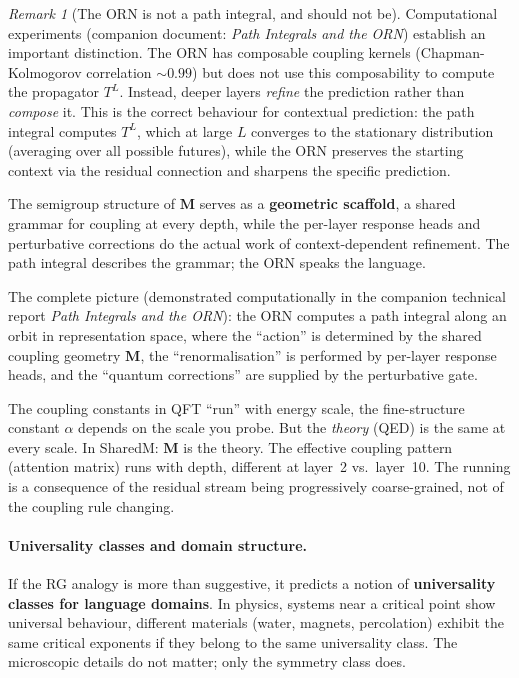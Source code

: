 \documentclass[11pt, a4paper]{article}
\newcommand{\M}{\mathbf{M}}
\theoremstyle{remark}
\newtheorem*{remark}{Remark}
\begin{document}
\begin{remark}[The ORN is not a path integral, and should not be]
Computational experiments (companion document: \textit{Path Integrals and the ORN}) establish an important distinction.
The ORN has composable coupling kernels (Chapman-Kolmogorov correlation ${\sim}0.99$) but does not use this composability to compute the propagator $T^L$.
Instead, deeper layers \emph{refine} the prediction rather than \emph{compose} it.
This is the correct behaviour for contextual prediction: the path integral computes $T^L$, which at large $L$ converges to the stationary distribution (averaging over all possible futures), while the ORN preserves the starting context via the residual connection and sharpens the specific prediction.

The semigroup structure of $\M$ serves as a \textbf{geometric scaffold}, a shared grammar for coupling at every depth, while the per-layer response heads and perturbative corrections do the actual work of context-dependent refinement.
The path integral describes the grammar; the ORN speaks the language.

The complete picture (demonstrated computationally in the companion technical report \textit{Path Integrals and the ORN}): the ORN computes a path integral along an orbit in representation space, where the ``action'' is determined by the shared coupling geometry $\M$, the ``renormalisation'' is performed by per-layer response heads, and the ``quantum corrections'' are supplied by the perturbative gate.
\end{remark}

The coupling constants in QFT ``run'' with energy scale, the fine-structure constant $\alpha$ depends on the scale you probe.
But the \emph{theory} (QED) is the same at every scale.
In SharedM: $\M$ is the theory.
The effective coupling pattern (attention matrix) runs with depth, different at layer~2 vs.\ layer~10.
The running is a consequence of the residual stream being progressively coarse-grained, not of the coupling rule changing.

\paragraph{Universality classes and domain structure.}
If the RG analogy is more than suggestive, it predicts a notion of \textbf{universality classes for language domains}.
In physics, systems near a critical point show universal behaviour, different materials (water, magnets, percolation) exhibit the same critical exponents if they belong to the same universality class.
The microscopic details do not matter; only the symmetry class does.
\end{document}
